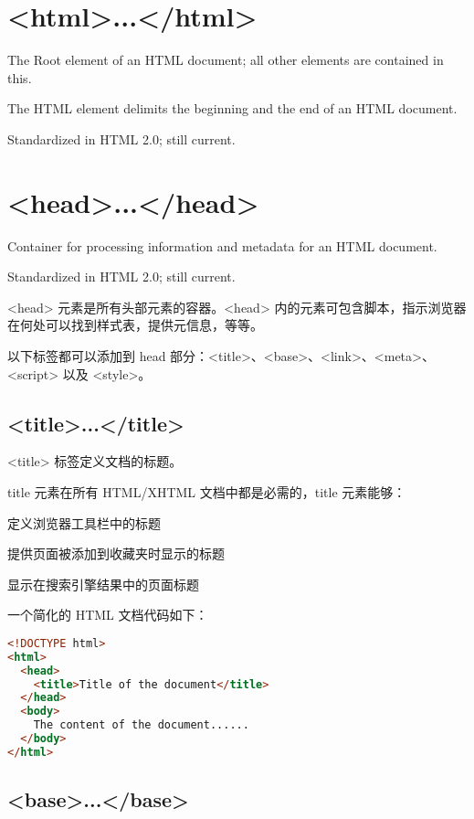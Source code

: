 \section{<html>...</html>}

The Root element of an HTML document; all other elements are contained in this.

The HTML element delimits the beginning and the end of an HTML document.

Standardized in HTML 2.0; still current.


\section{<head>...</head>}

Container for processing information and metadata for an HTML document.

Standardized in HTML 2.0; still current.

<head> 元素是所有头部元素的容器。<head> 内的元素可包含脚本，指示浏览器在何处可以找到样式表，提供元信息，等等。

以下标签都可以添加到 head 部分：<title>、<base>、<link>、<meta>、<script> 以及 <style>。

\subsection{<title>...</title>}

<title> 标签定义文档的标题。

title 元素在所有 HTML/XHTML 文档中都是必需的，title 元素能够：

\begin{compactitem}
\item 定义浏览器工具栏中的标题
\item 提供页面被添加到收藏夹时显示的标题
\item 显示在搜索引擎结果中的页面标题
\end{compactitem}

一个简化的 HTML 文档代码如下：

\begin{lstlisting}[language=HTML]
<!DOCTYPE html>
<html>
  <head>
    <title>Title of the document</title>
  </head>
  <body>
    The content of the document......
  </body>
</html>
\end{lstlisting}

\subsection{<base>...</base>}


